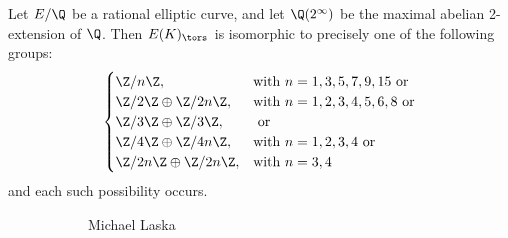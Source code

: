 \begin{frame}[plain]
\end{frame}





\begin{frame}[plain]
\footnotesize
\begin{thm}
Let $E/\Q$ be a rational elliptic curve, and let $\Q(2^\infty)$ be the maximal abelian 2-extension of $\Q$. Then $E(K)_\tors$ is isomorphic to precisely one of the following groups:
	\[
	\begin{cases}
	\Z/n\Z, & \text{with } n= 1, 3, 5, 7, 9, 15 \text{ or} \\
	\Z/2\Z \oplus \Z/2n\Z, & \text{with } n= 1, 2, 3, 4, 5, 6, 8 \text{ or} \\
	\Z/3\Z \oplus \Z/3\Z, & \text{ or} \\
	\Z/4\Z \oplus \Z/4n\Z, & \text{with } n= 1, 2, 3, 4 \text{ or} \\
	\Z/2n\Z \oplus \Z/2n\Z, & \text{with } n= 3, 4
	\end{cases}
	\]
and each such possibility occurs. 
\end{thm}
	\begin{figure}[h]
	\centering
	\begin{subfigure}{0.30\textwidth}
	\captionsetup{labelformat=empty}
	\centering
	\caption{\scriptsize Michael Laska}
	\end{subfigure}
	\begin{subfigure}{0.30\textwidth}

\end{subfigure}
\end{figure}
\end{frame}
